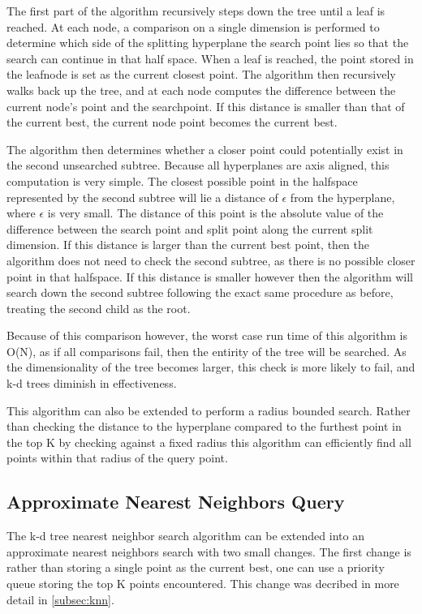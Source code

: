 The first part of the algorithm recursively steps down the tree until a leaf is reached.  At each node, a comparison on a single dimension is performed to determine which side of the splitting hyperplane the search point lies so that the search can continue in that half space.  When a leaf is reached, the point stored in the leafnode is set as the current closest point.  The algorithm then recursively walks back up the tree, and at each node computes the difference between the current node's point and the searchpoint.  If this distance is smaller than that of the current best, the current node point becomes the current best.

The algorithm then determines whether a closer point could potentially exist in the second unsearched subtree.  Because all hyperplanes are axis aligned, this computation is very simple.  The closest possible point in the halfspace represented by the second subtree will lie a distance of $\epsilon$ from the hyperplane, where $\epsilon$ is very small.  The distance of this point is the absolute value of the difference between the search point and split point along the current split dimension.  If this distance is larger than the current best point, then the algorithm does not need to check the second subtree, as there is no possible closer point in that halfspace.  If this distance is smaller however then the algorithm will search down the second subtree following the exact same procedure as before, treating the second child as the root.

Because of this comparison however, the worst case run time of this algorithm is O(N), as if all comparisons fail, then the entirity of the tree will be searched.  As the dimensionality of the tree becomes larger, this check is more likely to fail, and k-d trees diminish in effectiveness.

This algorithm can also be extended to perform a radius bounded search.  Rather than checking the distance to the hyperplane compared to the furthest point in the top K by checking against a fixed radius this algorithm can efficiently find all points within that radius of the query point.

\subsection{Approximate Nearest Neighbors Query}

The k-d tree nearest neighbor search algorithm can be extended into an approximate nearest neighbors search with two small changes.  The first change is rather than storing a single point as the current best, one can use a priority queue storing the top K points encountered.  This change was decribed in more detail in \ref{subsec:knn}.

